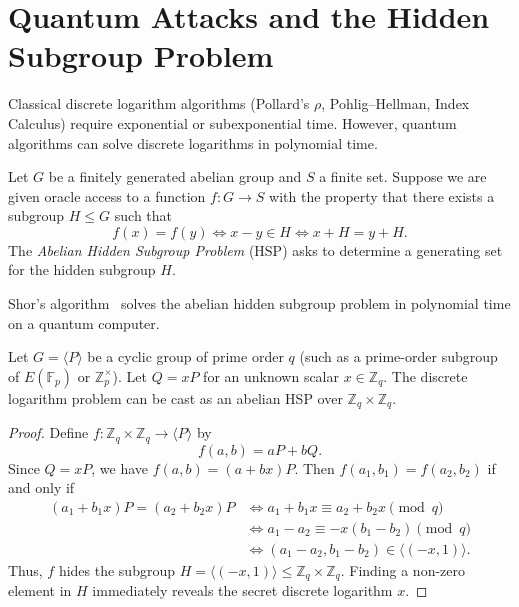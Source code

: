 
\section*{Quantum Attacks and the Hidden Subgroup Problem}

Classical discrete logarithm algorithms (Pollard's \(\rho\), Pohlig--Hellman, Index Calculus) require exponential or subexponential time.
However, quantum algorithms can solve discrete logarithms in polynomial time.

\begin{definition}
    Let \(G\) be a finitely generated abelian group and \(S\) a finite set.
    Suppose we are given oracle access to a function \(f \colon G \to S\) with the property that there exists a subgroup \(H \le G\) such that
    \[
        f(x) = f(y) \iff x - y \in H \iff x + H = y + H.
    \]
    The \emph{Abelian Hidden Subgroup Problem} (HSP) asks to determine a generating set for the hidden subgroup \(H\).
\end{definition}

Shor's algorithm~\cite{Shor1994} solves the abelian hidden subgroup problem in polynomial time on a quantum computer.

\begin{proposition}
    Let \(G = \langle P \rangle\) be a cyclic group of prime order \(q\) (such as a prime-order subgroup of \(E(\mathbb{F}_p)\) or \(\mathbb{Z}_p^\times\)).
    Let \(Q = xP\) for an unknown scalar \(x \in \mathbb{Z}_q\).
    The discrete logarithm problem can be cast as an abelian HSP over \(\mathbb{Z}_q \times \mathbb{Z}_q\).
\end{proposition}

\begin{proof}
    Define \(f \colon \mathbb{Z}_q \times \mathbb{Z}_q \to \langle P \rangle\) by
    \[
        f(a, b) = aP + bQ.
    \]
    Since \(Q = xP\), we have \(f(a, b) = (a + bx)P\).
    Then \(f(a_1, b_1) = f(a_2, b_2)\) if and only if
    \begin{align*}
        (a_1 + b_1 x)P = (a_2 + b_2 x)P
        &\iff a_1 + b_1 x \equiv a_2 + b_2 x \pmod q \\
        &\iff a_1 - a_2 \equiv -x(b_1 - b_2) \pmod q \\
        &\iff (a_1 - a_2, b_1 - b_2) \in \langle (-x, 1) \rangle.
    \end{align*}
    Thus, \(f\) hides the subgroup \(H = \langle (-x, 1) \rangle \le \mathbb{Z}_q \times \mathbb{Z}_q\).
    Finding a non-zero element in \(H\) immediately reveals the secret discrete logarithm \(x\).
\end{proof}

